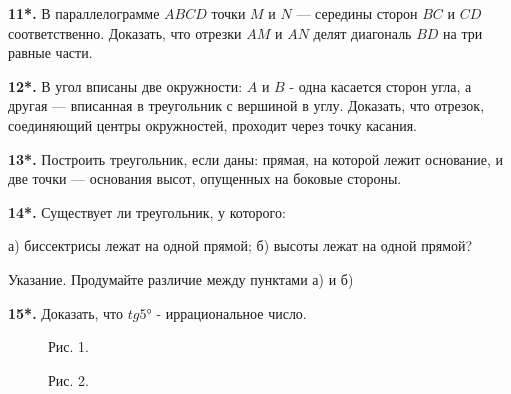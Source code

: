\vspace{0.5em}

\textbf{11*.} В параллелограмме \( ABCD \) точки \( M \) и \( N \) — середины сторон \( BC \) и \( CD \) соответственно. Доказать, что отрезки \( AM \) и \( AN \) делят диагональ \( BD \) на три равные части.

\vspace{0.5em}

\textbf{12*.} В угол вписаны две окружности: \(A \) и \(B \) - одна касается сторон угла, а другая — вписанная в треугольник с вершиной в углу. Доказать, что отрезок, соединяющий центры окружностей, проходит через точку касания.

\vspace{0.5em}

\textbf{13*.} Построить треугольник, если даны: прямая, на которой лежит основание, и две точки — основания высот, опущенных на боковые стороны.

\vspace{0.5em}

\textbf{14*.} Существует ли треугольник, у которого:  

а) биссектрисы лежат на одной прямой;  
б) высоты лежат на одной прямой?


\small Указание. Продумайте различие между пунктами а) и б)

\vspace{0.5em}

\textbf{15*.} Доказать, что $tg 5°$ - иррациональное число.

\begin{figure}[H]
\centering
{}
\caption{Рис. 1.}
\end{figure}

\begin{figure}[H]
\centering
{}
\caption{Рис. 2.}
\end{figure}

